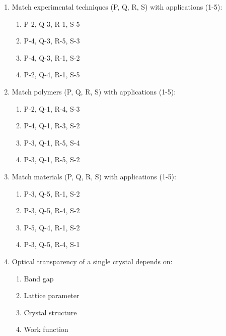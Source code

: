 \documentclass[journal,cmex10]{IEEEtran}
\theoremstyle{remark}
\numberwithin{equation}{enumi}
\numberwithin{figure}{enumi}
\begin{document}
\begin{enumerate}[label=\arabic*)]
\vspace{0.5cm}
\item Match experimental techniques (P, Q, R, S) with applications (1-5):  
\vspace{0.3cm}
\hfill{}


\begin{enumerate}[label=\alph*)]
    \item P-2, Q-3, R-1, S-5
    \item P-4, Q-3, R-5, S-3
    \item P-4, Q-3, R-1, S-2
    \item P-2, Q-4, R-1, S-5
\end{enumerate}

\vspace{0.5cm}
\item  Match polymers (P, Q, R, S) with applications (1-5):    
\hfill{}



\begin{enumerate}[label=\alph*)]
    \item P-2, Q-1, R-4, S-3
    \item P-4, Q-1, R-3, S-2
    \item P-3, Q-1, R-5, S-4
    \item P-3, Q-1, R-5, S-2
\end{enumerate}

\newpage
\item  Match materials (P, Q, R, S) with applications (1-5):  


\hfill{}
\vspace{0.3cm}
\begin{enumerate}[label=\alph*)]
    \item P-3, Q-5, R-1, S-2
    \item P-3, Q-5, R-4, S-2
    \item P-5, Q-4, R-1, S-2
    \item P-3, Q-5, R-4, S-1
\end{enumerate}

\vspace{0.5cm}
\item  Optical transparency of a single crystal depends on:  
\hfill{}
\begin{enumerate}[label=\alph*)]
    \item Band gap
    \item Lattice parameter
    \item Crystal structure
    \item Work function
\end{enumerate}


\end{enumerate}
\end{document}
